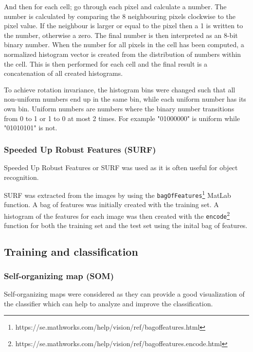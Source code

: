 \documentclass[doc/report.tex]{subfiles}
\begin{document}
And then for each cell; go through each pixel and calculate a number. The
number is calculated by comparing the 8 neighbouring pixels clockwise to the
pixel value. If the neighbour is larger or equal to the pixel then a 1 is
written to the number, otherwise a zero. The final number is then interpreted
as an 8-bit binary number. When the number for all pixels in the cell has been
computed, a normalized histogram vector is created from the distribution of
numbers within the cell. This is then performed for each cell and the final
result is a concatenation of all created histograms.

To achieve rotation invariance, the histogram bins were changed such that all
non-uniform numbers end up in the same bin, while each uniform number has its
own bin. Uniform numbers are numbers where the binary number transitions from 0
to 1 or 1 to 0 at most 2 times. For example "01000000" is uniform while
"01010101" is not.

\subsubsection{Speeded Up Robust Features (SURF)}
Speeded Up Robust Features or SURF was used as it is often useful for object
recognition.

SURF was extracted from the images by using the
\texttt{bagOfFeatures}\footnote{https://se.mathworks.com/help/vision/ref/bagoffeatures.html}
MatLab function. A bag of features was initially created with the training set.
A histogram of the features for each image was then created with the
\texttt{encode}\footnote{https://se.mathworks.com/help/vision/ref/bagoffeatures.encode.html}
function for both the training set and the test set using the inital bag of
features.

\subsection{Training and classification}


\subsubsection{Self-organizing map (SOM)}
Self-organizing maps were considered as they can provide a good visualization
of the classifier which can help to analyze and improve the classification.
\end{document}
